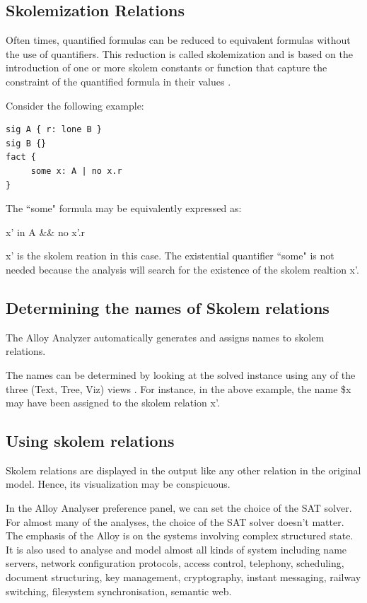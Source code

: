\documentclass[a4paper,12pt]{report}
\begin{document}
\subsection{Skolemization Relations }
\label{Skolemization relations}

Often times, quantified formulas can be reduced to equivalent formulas without the use of quantifiers.
This reduction is called skolemization and is based on the introduction of one or more skolem constants or function that capture the constraint of the quantified formula in their values \cite{DanielJackson2004}.

Consider the following example: 

\begin{verbatim}
sig A { r: lone B } 
sig B {}
fact {
	 some x: A | no x.r
}
\end{verbatim}

 The ``some" formula may be equivalently expressed as: 

    x' in A \&\& no x'.r 
    
x' is the skolem reation in this case. The existential quantifier ``some" is not needed because the analysis will search for the existence of the skolem realtion x'\cite{J.M.Wing1996}.
  
\subsection{Determining the names of Skolem relations }
\label{determine skolem relations}

 The Alloy Analyzer automatically generates and assigns names to skolem relations.
 
The names can be determined by looking at the solved instance using any of the three (Text, Tree, Viz) views \cite{DanielJackson2004}.
For instance, in the above example, the name \$x may have been assigned to the skolem relation x'. 

\subsection{Using skolem relations }
\label{Use of skolem relations}

Skolem relations are displayed in the output like any other relation in the original model. Hence, its visualization may be conspicuous.

In the Alloy Analyser preference panel, we can set the choice of the SAT solver. For almost many of the analyses, the choice of the SAT solver doesn't matter. The emphasis of the Alloy is on the systems involving complex structured state. It is also used to analyse and model almost all kinds of system including name servers, network configuration protocols, access control, telephony, scheduling, document structuring, key management, cryptography, instant messaging, railway switching, filesystem synchronisation, semantic web. 
\end{document}
